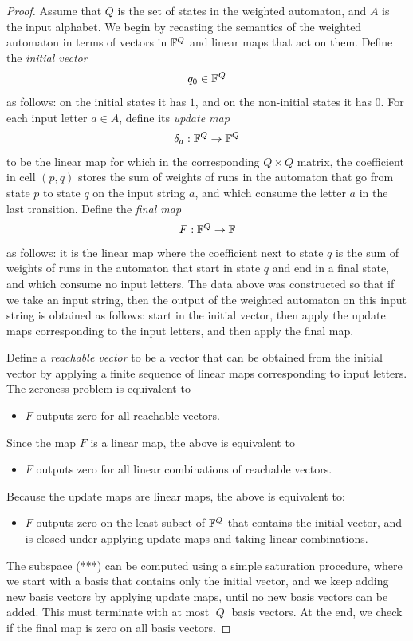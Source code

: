 \begin{proof} Assume that $Q$ is the set of states in the weighted automaton, and $A$ is the input alphabet. We begin by recasting the semantics of the weighted automaton in terms of vectors in $\mathbb F^Q$ and linear maps that act on them.  Define the \emph{initial vector}
    \begin{align*}
    q_0 \in \mathbb F^Q
    \end{align*}
    as follows: on the initial states it has $1$, and on the non-initial states it has $0$. For each input letter $a \in A$, define its   \emph{update  map}
    \begin{align*}
    \delta_a : \mathbb F^Q \to \mathbb F^Q
    \end{align*}
    to be the linear map for which  in the corresponding $Q \times Q$ matrix, the coefficient in cell $(p,q)$ stores the sum of weights of runs in the automaton that go from state $p$ to state $q$ on the input string $a$, and which consume the letter $a$ in the last transition. Define the \emph{final map}
    \begin{align*}
    F : \mathbb F^Q \to \mathbb F
    \end{align*}
    as follows: it is the  linear map where  the coefficient  next to state $q$ is the sum of weights of runs in the automaton that start in state $q$ and end in a final state, and which consume no input letters. The data above was constructed so that if we take an input string, then the output of the weighted automaton on this input string is obtained as follows: start in the initial vector, then apply the update maps corresponding to the input letters, and then apply the final map.

    Define a \emph{reachable vector} to be a vector that can be obtained from the initial vector by applying a finite sequence of linear maps corresponding to input letters. The zeroness problem is equivalent to 
    \begin{itemize}
        \item[(*)] $F$ outputs zero for all reachable vectors.
    \end{itemize}
    Since the map $F$ is a linear map, the above is equivalent to
\begin{itemize}
    \item[(**)] $F$ outputs zero for all linear combinations of reachable vectors.
\end{itemize}
Because the update maps  are linear maps, the above is equivalent to:
\begin{itemize}
    \item[(***)] $F$ outputs zero on the least subset of $\mathbb F^Q$ that contains the initial vector, and is closed under applying update maps and taking linear combinations.
\end{itemize}
The subspace (***) can be computed using a simple saturation procedure, where we start with a basis that contains only the initial vector, and we keep adding new basis vectors by applying update maps, until no new basis vectors can be added. This must terminate with at most $|Q|$ basis vectors. At the end, we check if the final map is zero on all basis vectors.  
\end{proof}
